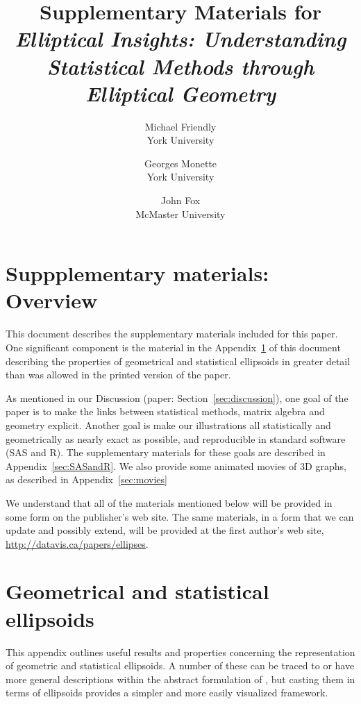 \documentclass[11pt]{article}%
\newcommand*{\secref}[1]{Section~\ref{#1}}
\newcommand*{\appref}[1]{Appendix~\ref{#1}}
\begin{document}
\begin{titlepage}
\title{Supplementary Materials for \emph{Elliptical Insights: Understanding Statistical Methods through Elliptical Geometry}}
\author{Michael Friendly%
 \\ York University
\and
Georges Monette \\ York University
\and
John Fox \\ McMaster University
}
\end{titlepage}
\maketitle

\section*{Suppplementary materials: Overview}

This document describes the supplementary materials included for this paper.  One significant component
is the material in the \appref{sec:Appendix} of this document describing the properties of geometrical and statistical
ellipsoids in greater detail than was allowed in the printed version of the paper.

As mentioned in our Discussion
(paper: \secref{sec:discussion}), one goal of the paper is to make the links between statistical methods, matrix algebra
and geometry explicit. Another goal is make our illustrations all statistically and geometrically 
as nearly exact as possible, and reproducible in standard software (SAS and R).  The supplementary materials
for these goals are described in \appref{sec:SASandR}.  We also provide some animated movies of 3D
graphs, as described in \appref{sec:movies}

We understand that all of the materials mentioned below will be provided in some form on the publisher's
web site.  The same materials, in a form that we can update and possibly extend, will be provided
at the first author's web site, \url{http://datavis.ca/papers/ellipses}. 

\appendix
{}
\section{Geometrical and statistical ellipsoids}\label{sec:Appendix}
This appendix outlines useful results and properties concerning the representation of geometric and statistical ellipsoids.
A number of these can be traced to or have more general descriptions within the abstract formulation of \citet{Dempster:69},
but casting them in terms of ellipsoids provides a simpler and more easily visualized framework. 




\end{document}
